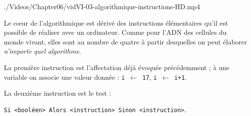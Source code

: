 \begin{marginvideo}
		{./Videos/Chapter06/vidVI-03-algorithmique-instructions-HD.mp4}%
\end{marginvideo}

Le cœur de l'algorithmique est dérivé des instructions élémentaires qu'il est possible de réaliser avec un ordinateur. Comme pour l'ADN des cellules du monde vivant, elles sont au nombre de quatre à partir desquelles on peut élaborer \emph{n'importe quel algorithme}.

La première instruction est l'affectation déjà évoquée précédemment ; à une variable on associe une valeur donnée : \texttt{i $\leftarrow$ 17}, \texttt{i $\leftarrow$ i+1}.

La deuxième instruction est le test :

\vspace{-0.7\baselineskip}
\begin{center}
\lstinline[style=lstalgostyle,basicstyle=\normalsize\shellttfont]{Si <booléen> Alors <instruction> Sinon <instruction>}.
\end{center}
\vspace{-0.7\baselineskip}

